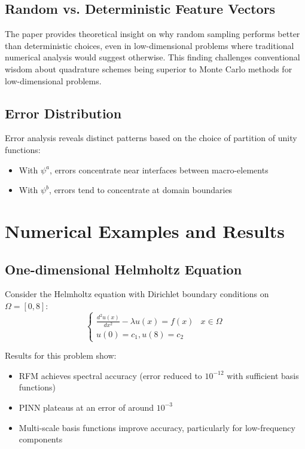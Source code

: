 \documentclass[11pt]{article}
\begin{document}
\subsection{Random vs. Deterministic Feature Vectors}
The paper provides theoretical insight on why random sampling performs better than deterministic choices, even in low-dimensional problems where traditional numerical analysis would suggest otherwise. This finding challenges conventional wisdom about quadrature schemes being superior to Monte Carlo methods for low-dimensional problems.

\subsection{Error Distribution}
Error analysis reveals distinct patterns based on the choice of partition of unity functions:
\begin{itemize}
    \item With $\psi^a$, errors concentrate near interfaces between macro-elements
    \item With $\psi^b$, errors tend to concentrate at domain boundaries
\end{itemize}

\section{Numerical Examples and Results}

\subsection{One-dimensional Helmholtz Equation}
Consider the Helmholtz equation with Dirichlet boundary conditions on $\Omega = [0,8]$:
\begin{equation}
\begin{cases}
\frac{d^2 u(x)}{dx^2} - \lambda u(x) = f(x) & x \in \Omega \\
u(0) = c_1, u(8) = c_2
\end{cases}
\end{equation}

Results for this problem show:
\begin{itemize}
    \item RFM achieves spectral accuracy (error reduced to $10^{-12}$ with sufficient basis functions)
    \item PINN plateaus at an error of around $10^{-3}$
    \item Multi-scale basis functions improve accuracy, particularly for low-frequency components
\end{itemize}
\end{document}
